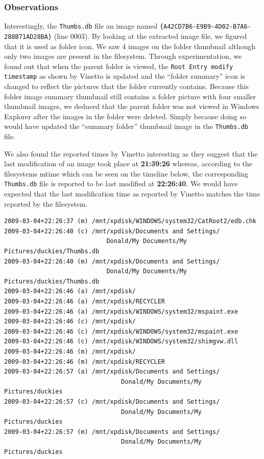 \documentclass[a4paper,
    11pt,
    normalheadings,
    parindent,
    UKenglish,
    abstracton,
    ]{scrartcl}
\begin{document}
\subsubsection{Observations}
Interestingly, the {\tt Thumbs.db} file an image named
\texttt{\{A42CD7B6-E9B9-4D02-B7A6-288B71AD28BA\}}
(line 0003).
By looking at the extracted image file, we figured that it is used as folder icon.
We saw 4 images on the folder thumbnail although only two images are present in the filesystem.
Through experimentation, we found out that when the parent folder is viewed, the \texttt{Root Entry modify timestamp} as shown by Vinetto is updated and the ``folder summary'' icon is changed to reflect the pictures that the folder currently contains.
Because this folder image summary thumbnail still contains a folder picture with four smaller thumbnail images, we deduced that the parent folder was not viewed in Windows Explorer after the images in the folder were deleted.
Simply because doing so would have updated the ``summary folder'' thumbnail image in the \texttt{Thumbs.db} file.



We also found the reported times by Vinetto interesting as they suggest that the last modification of an image took place at \textbf{21:39:26} whereas, according to the filesystems mtime which can be seen on the timeline below, the corresponding \texttt{Thumbs.db} file is reported to be last modified at \textbf{22:26:40}.
We would have expected that the last modification time as reported by Vinetto matches the time reported by the filesystem.
\begin{verbatim}
2009-03-04+22:26:37 (m) /mnt/xpdisk/WINDOWS/system32/CatRoot2/edb.chk
2009-03-04+22:26:40 (c) /mnt/xpdisk/Documents and Settings/
                            Donald/My Documents/My Pictures/duckies/Thumbs.db
2009-03-04+22:26:40 (m) /mnt/xpdisk/Documents and Settings/
                            Donald/My Documents/My Pictures/duckies/Thumbs.db
2009-03-04+22:26:46 (a) /mnt/xpdisk/
2009-03-04+22:26:46 (a) /mnt/xpdisk/RECYCLER
2009-03-04+22:26:46 (a) /mnt/xpdisk/WINDOWS/system32/mspaint.exe
2009-03-04+22:26:46 (c) /mnt/xpdisk/
2009-03-04+22:26:46 (c) /mnt/xpdisk/WINDOWS/system32/mspaint.exe
2009-03-04+22:26:46 (c) /mnt/xpdisk/WINDOWS/system32/shimgvw.dll
2009-03-04+22:26:46 (m) /mnt/xpdisk/
2009-03-04+22:26:46 (m) /mnt/xpdisk/RECYCLER
2009-03-04+22:26:57 (a) /mnt/xpdisk/Documents and Settings/
                                Donald/My Documents/My Pictures/duckies
2009-03-04+22:26:57 (c) /mnt/xpdisk/Documents and Settings/
                                Donald/My Documents/My Pictures/duckies
2009-03-04+22:26:57 (m) /mnt/xpdisk/Documents and Settings/
                                Donald/My Documents/My Pictures/duckies
\end{verbatim}
\end{document}
